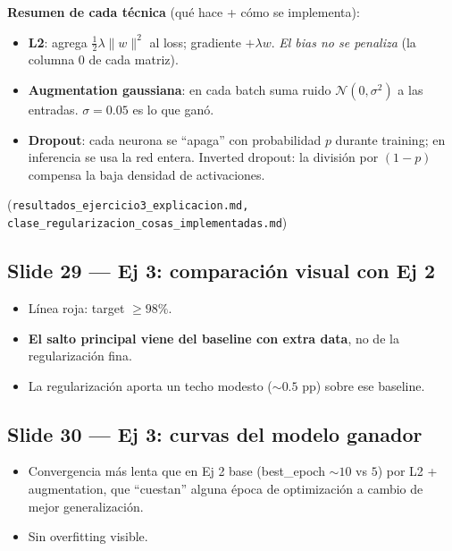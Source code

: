 \documentclass[11pt,a4paper]{article}
\newcommand{\nref}[1]{\textcolor{muted}{\small(\texttt{#1})}}
\begin{document}
\begin{nota}
\textbf{Resumen de cada técnica} (qué hace + cómo se implementa):
\begin{itemize}[leftmargin=*,topsep=2pt]
  \item \textbf{L2}: agrega $\frac{1}{2} \lambda \|w\|^2$ al loss; gradiente
        $+\lambda w$. \emph{El bias no se penaliza} (la columna 0 de cada matriz).
  \item \textbf{Augmentation gaussiana}: en cada batch suma ruido
        $\mathcal{N}(0, \sigma^2)$ a las entradas. $\sigma = 0.05$ es lo que
        ganó.
  \item \textbf{Dropout}: cada neurona se ``apaga'' con probabilidad $p$ durante
        training; en inferencia se usa la red entera. Inverted dropout: la
        división por $(1-p)$ compensa la baja densidad de activaciones.
\end{itemize}
\nref{resultados\_ejercicio3\_explicacion.md, clase\_regularizacion\_cosas\_implementadas.md}
\end{nota}

\subsection{Slide 29 — Ej 3: comparación visual con Ej 2}

\begin{decir}
\begin{itemize}[leftmargin=*,topsep=0pt]
  \item Línea roja: target $\geq 98\%$.
  \item \textbf{El salto principal viene del baseline con extra data}, no de la
        regularización fina.
  \item La regularización aporta un techo modesto ($\sim 0.5$ pp) sobre ese
        baseline.
\end{itemize}
\end{decir}

\subsection{Slide 30 — Ej 3: curvas del modelo ganador}

\begin{decir}
\begin{itemize}[leftmargin=*,topsep=0pt]
  \item Convergencia más lenta que en Ej 2 base (best\_epoch $\sim 10$ vs $5$)
        por L2 + augmentation, que ``cuestan'' alguna época de optimización a
        cambio de mejor generalización.
  \item Sin overfitting visible.
\end{itemize}
\end{decir}
\end{document}
